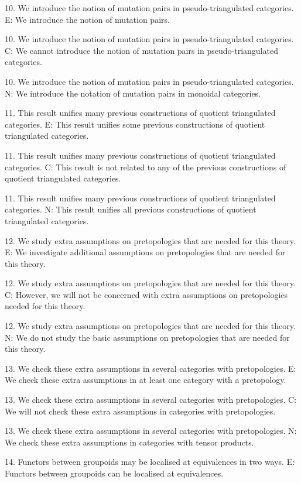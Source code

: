10. We introduce the notion of mutation pairs in pseudo-triangulated categories.
E: We introduce the notion of mutation pairs.

10. We introduce the notion of mutation pairs in pseudo-triangulated categories.
C: We cannot introduce the notion of mutation pairs in pseudo-triangulated categories.

10. We introduce the notion of mutation pairs in pseudo-triangulated categories.
N: We introduce the notation of mutation pairs in monoidal categories.

11. This result unifies many previous constructions of quotient triangulated categories.
E: This result unifies some previous constructions of quotient triangulated categories.

11. This result unifies many previous constructions of quotient triangulated categories.
C: This result is not related to any of the previous constructions of quotient triangulated categories.

11. This result unifies many previous constructions of quotient triangulated categories.
N: This result unifies all previous constructions of quotient triangulated categories.

12. We study extra assumptions on pretopologies that are needed for this theory.
E: We investigate additional assumptions on pretopologies that are needed for this theory.

12. We study extra assumptions on pretopologies that are needed for this theory.
C: However, we will not be concerned with extra assumptions on pretopologies needed for this theory.

12. We study extra assumptions on pretopologies that are needed for this theory.
N: We do not study the basic assumptions on pretopologies that are needed for this theory.

13. We check these extra assumptions in several categories with pretopologies.
E: We check these extra assumptions in at least one category with a pretopology.

13. We check these extra assumptions in several categories with pretopologies.
C: We will not check these extra assumptions in categories with pretopologies.

13. We check these extra assumptions in several categories with pretopologies.
N: We check these extra assumptions in  categories with tensor products.


14. Functors between groupoids may be localised at equivalences in two ways.
E: Functors between groupoids can be localised at equivalences.

